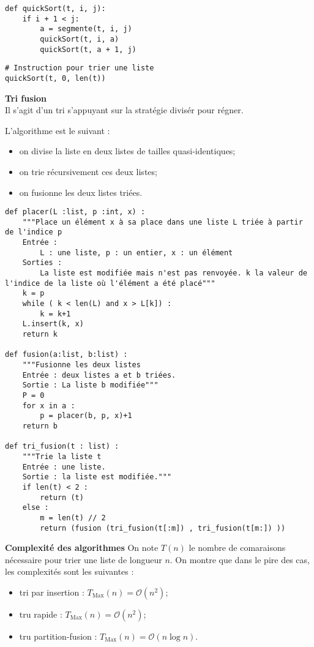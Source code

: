 \begin{lstlisting}
def quickSort(t, i, j):
    if i + 1 < j:
        a = segmente(t, i, j)
        quickSort(t, i, a)
        quickSort(t, a + 1, j)
\end{lstlisting}

\begin{lstlisting}
# Instruction pour trier une liste
quickSort(t, 0, len(t))
\end{lstlisting}
\begin{defi}\textbf{Tri fusion} \\
Il s'agit d'un tri s'appuyant sur la stratégie divisér pour régner. 

L'algorithme est le suivant : 
\begin{itemize}
\item on divise la liste en deux listes de tailles quasi-identiques;
\item on trie récursivement ces deux listes;
\item on fusionne les deux listes triées.
\end{itemize}
\end{defi}

\begin{lstlisting}
def placer(L :list, p :int, x) :
    """Place un élément x à sa place dans une liste L triée à partir de l'indice p
    Entrée :
        L : une liste, p : un entier, x : un élément
    Sorties :
        La liste est modifiée mais n'est pas renvoyée. k la valeur de l'indice de la liste où l'élément a été placé"""
    k = p
    while ( k < len(L) and x > L[k]) :
        k = k+1
    L.insert(k, x)
    return k
    
def fusion(a:list, b:list) :
    """Fusionne les deux listes
    Entrée : deux listes a et b triées.
    Sortie : La liste b modifiée"""
    P = 0
    for x in a :
        p = placer(b, p, x)+1
    return b

def tri_fusion(t : list) :
    """Trie la liste t
    Entrée : une liste.
    Sortie : la liste est modifiée."""
    if len(t) < 2 :
        return (t)
    else :
        m = len(t) // 2
        return (fusion (tri_fusion(t[:m]) , tri_fusion(t[m:]) ))
\end{lstlisting}

\begin{proposition}\textbf{Complexité des algorithmes}
On note $T(n)$ le nombre de comaraisons nécessaire pour trier une liste de longueur $n$. 
On montre que dans le pire des cas, les complexités sont les suivantes :
\begin{itemize}
\item tri par insertion : $T_{\text{Max}}(n)=\mathcal{O}\left(n^2\right)$;
\item tru rapide : $T_{\text{Max}}(n)=\mathcal{O}\left(n^2\right)$;
\item tru partition-fusion : $T_{\text{Max}}(n)=\mathcal{O}\left(n\log n\right)$.
\end{itemize}



\end{proposition}




